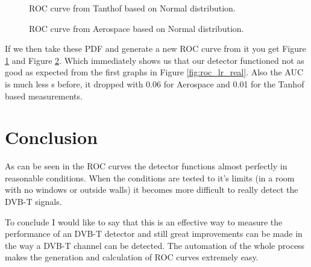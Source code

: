 \documentclass[]{article}
\begin{document}
\begin{figure}[H]
    
    \caption{ROC curve from Tanthof based on Normal distribution.\label{fig:roc_tant_norm}}
\end{figure}
\begin{figure}[H]
    
    \caption{ROC curve from Aerospace based on Normal distribution.\label{fig:roc_lr_norm}}
\end{figure}

If we then take these PDF and generate a new ROC curve from it you get Figure \ref{fig:roc_tant_norm} and Figure \ref{fig:roc_lr_norm}.
Which immediately shows us that our detector functioned not as good as expected from the first graphs in Figure \ref{fig:roc_lr_real}.
Also the AUC is much less s before, it dropped with 0.06 for Aerospace and 0.01 for the Tanhof based measurements.

\section{Conclusion}
As can be seen in the ROC curves the detector functions almost perfectly in reasonable conditions.
When the conditions are tested to it's limits (in a room with no windows or outside walls) it becomes more difficult to really detect the DVB-T signals.

To conclude I would like to say that this is an effective way to measure the performance of an DVB-T detector and still great improvements can be made in the way a DVB-T channel can be detected.
The automation of the whole process makes the generation and calculation of ROC curves extremely easy.
\end{document}
